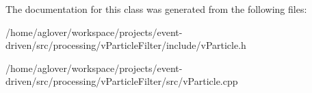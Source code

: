 The documentation for this class was generated from the following files\+:\begin{DoxyCompactItemize}
\item 
/home/aglover/workspace/projects/event-\/driven/src/processing/v\+Particle\+Filter/include/v\+Particle.\+h\item 
/home/aglover/workspace/projects/event-\/driven/src/processing/v\+Particle\+Filter/src/v\+Particle.\+cpp\end{DoxyCompactItemize}
